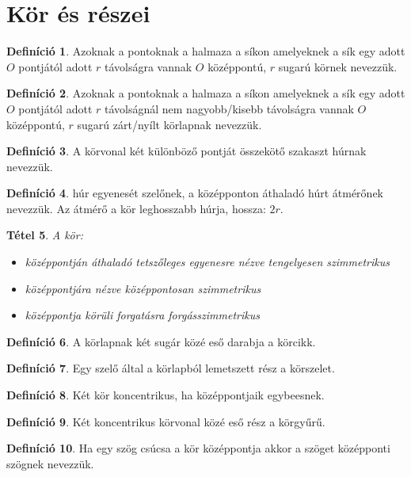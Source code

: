 \documentclass[twoside,12pt]{report}
\newtheorem{theorem}{Tétel}[section]
\theoremstyle{definition}
\newtheorem{definition}[theorem]{Definíció}
\begin{document}
\section{Kör és részei}
	\begin{definition}
		Azoknak a pontoknak a halmaza a síkon amelyeknek a sík egy adott $O$ pontjától adott
		$r$ távolságra vannak $O$ középpontú, $r$ sugarú körnek nevezzük.
	\end{definition}
	\begin{definition}
		Azoknak a pontoknak a halmaza a síkon amelyeknek a sík egy adott $O$ pontjától adott
		$r$ távolságnál nem nagyobb/kisebb távolságra vannak $O$ középpontú, $r$ sugarú zárt/nyílt körlapnak nevezzük.
	\end{definition}
	\begin{definition}
		A körvonal két különböző pontját összekötő szakaszt húrnak nevezzük.
	\end{definition}
	\begin{definition}
		húr egyenesét szelőnek, a középponton áthaladó húrt átmérőnek nevezzük. Az átmérő
		a kör leghosszabb húrja, hossza: $2r$.
	\end{definition}
	\begin{theorem}
		A kör:
		\begin{itemize}
			\item középpontján áthaladó tetszőleges egyenesre nézve tengelyesen szimmetrikus
			\item középpontjára nézve középpontosan szimmetrikus
			\item középpontja körüli forgatásra forgásszimmetrikus
		\end{itemize}
	\end{theorem}
	\begin{definition}
		A körlapnak két sugár közé eső darabja a körcikk.
	\end{definition}
	\begin{definition}
		Egy szelő által a körlapból lemetszett rész a körszelet.
	\end{definition}
	\begin{definition}
		Két kör koncentrikus, ha középpontjaik egybeesnek.
	\end{definition}
	\begin{definition}
		Két koncentrikus körvonal közé eső rész a körgyűrű.
	\end{definition}
	\begin{definition}
		Ha egy szög csúcsa a kör középpontja akkor a szöget középponti szögnek nevezzük.
	\end{definition}
\end{document}
